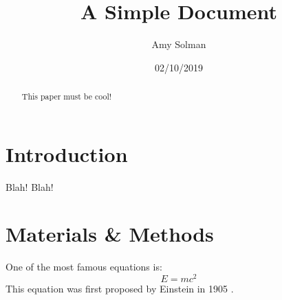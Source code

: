 \documentclass[12pt]{article}
\title{A Simple Document}
\author{Amy Solman}
\date{02/10/2019}
\begin{document}
  \maketitle
  
  \begin{abstract}
  This paper must be cool!
  \end{abstract}
  
  \section{Introduction}
  Blah! Blah!

  \section{Materials \& Methods}
  One of the most famous equations is:
  \begin{equation}
    E=mc^2
  \end{equation}
  This equation was first proposed by Einstein in 1905
  \cite{einstein1905does}.

  
  
\end{document}
